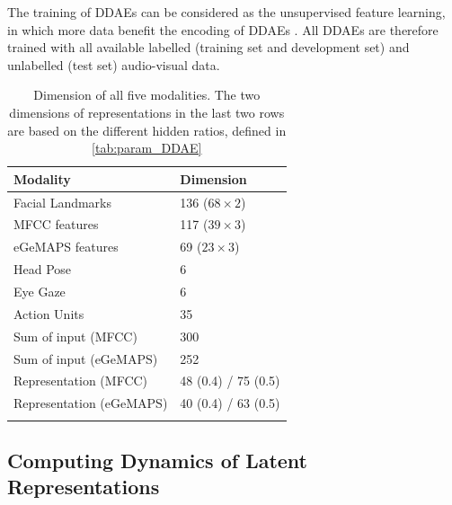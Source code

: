 The training of DDAEs can be considered as the unsupervised feature learning, in which more data benefit the encoding of DDAEs \cite{ngiam2011}. All DDAEs are therefore trained with all available labelled (training set and development set) and unlabelled (test set) audio-visual data. 

\begin{table}[ht]
    \centering
    \caption{Dimension of all five modalities. The two dimensions of representations in the last two rows are based on the different hidden ratios, defined in \ref{tab:param_DDAE}}
    \begin{tabular}{l|l}
        \Xhline{2\arrayrulewidth}
        Modality & Dimension \\
        \hline
        Facial Landmarks & 136 ($68 \times 2$) \\
        MFCC features & 117 ($39 \times 3$) \\
        eGeMAPS features & 69 ($23 \times 3$) \\
        Head Pose & 6 \\
        Eye Gaze & 6 \\
        Action Units & 35 \\
        \hline
        Sum of input (MFCC) & 300 \\
        Sum of input (eGeMAPS) & 252 \\
        \hline
        Representation (MFCC) & 48 (0.4) / 75 (0.5) \\
        Representation (eGeMAPS) & 40 (0.4) / 63 (0.5) \\
        \Xhline{2\arrayrulewidth}
    \end{tabular}
    \label{tab:dim_modality}
\end{table}

\subsection{Computing Dynamics of Latent Representations}

